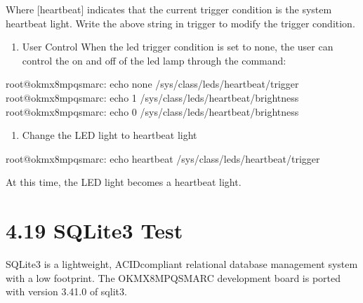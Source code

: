 \documentclass[letterpaper,10pt,openany,english]{sphinxmanual}
\begin{document}
\sphinxAtStartPar
Where {[}heartbeat{]} indicates that the current trigger condition is the system heartbeat light. Write the above string in trigger to modify the trigger condition.
\begin{enumerate}
%
\setcounter{enumi}{1}
\item {} 
\sphinxAtStartPar
User Control When the led trigger condition is set to none, the user can control the on and off of the led lamp through the command:

\end{enumerate}

\begin{sphinxVerbatim}[commandchars=\\\{\}]
root@ok\PYGZhy{}mx8mpq\PYGZhy{}smarc:\PYGZti{}\PYGZsh{} echo none \PYGZgt{} /sys/class/leds/heartbeat/trigger
root@ok\PYGZhy{}mx8mpq\PYGZhy{}smarc:\PYGZti{}\PYGZsh{} echo 1 \PYGZgt{} /sys/class/leds/heartbeat/brightness
root@ok\PYGZhy{}mx8mpq\PYGZhy{}smarc:\PYGZti{}\PYGZsh{} echo 0 \PYGZgt{} /sys/class/leds/heartbeat/brightness
\end{sphinxVerbatim}
\begin{enumerate}
%
\setcounter{enumi}{2}
\item {} 
\sphinxAtStartPar
Change the LED light to heartbeat light

\end{enumerate}

\begin{sphinxVerbatim}[commandchars=\\\{\}]
root@ok\PYGZhy{}mx8mpq\PYGZhy{}smarc:\PYGZti{}\PYGZsh{} echo heartbeat \PYGZgt{} /sys/class/leds/heartbeat/trigger
\end{sphinxVerbatim}

\sphinxAtStartPar
At this time, the LED light becomes a heartbeat light.


\section{4.19 SQLite3 Test}
\label{\detokenize{linux-manual:sqlite3-test}}
\sphinxAtStartPar
SQLite3 is a lightweight, ACID\sphinxhyphen{}compliant relational database management system with a low footprint. The OK\sphinxhyphen{}MX8MPQ\sphinxhyphen{}SMARC development board is ported with version 3.41.0 of sqlit3.
\end{document}

